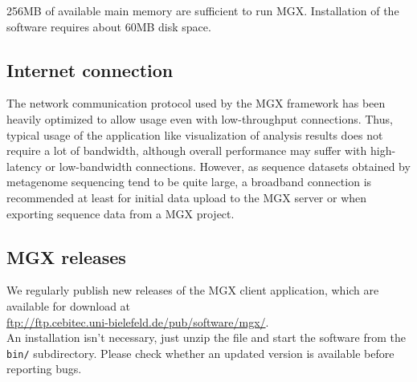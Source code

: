 256MB of available main memory are sufficient to run MGX. Installation of the
software requires about 60MB disk space.

\subsection{Internet connection}

The network communication protocol used by the MGX framework has been heavily optimized to
allow usage even with low-throughput connections. Thus, typical usage of the application
like visualization of analysis results does not require a lot of bandwidth, although
overall performance may suffer with high-latency or low-bandwidth connections. However, as
sequence datasets obtained by metagenome sequencing tend to be quite large, a broadband 
connection is recommended at least for initial data upload to the MGX server or when exporting
sequence data from a MGX project.

\subsection{MGX releases}

We regularly publish new releases of the MGX client application, which are
available for download at\\

    \url{ftp://ftp.cebitec.uni-bielefeld.de/pub/software/mgx/}.\\

An installation isn't necessary, just unzip the file and start the software
from the \texttt{bin/} subdirectory. Please check whether an updated version
is available before reporting bugs.

